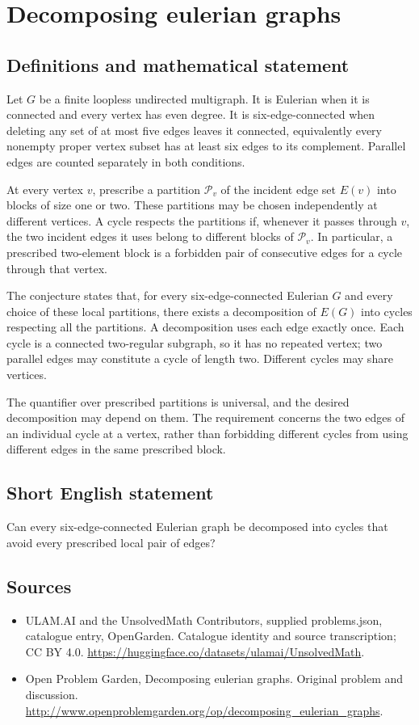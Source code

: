 \documentclass[11pt,a4paper]{article}
\begin{document}
\section*{Decomposing eulerian graphs}\label{statement}

\subsection{Definitions and mathematical statement}
Let $G$ be a finite loopless undirected multigraph. It is Eulerian when it is connected and every vertex has even degree. It is six-edge-connected when deleting any set of at most five edges leaves it connected, equivalently every nonempty proper vertex subset has at least six edges to its complement. Parallel edges are counted separately in both conditions.

At every vertex $v$, prescribe a partition $\mathcal P_v$ of the incident edge set $E(v)$ into blocks of size one or two. These partitions may be chosen independently at different vertices. A cycle respects the partitions if, whenever it passes through $v$, the two incident edges it uses belong to different blocks of $\mathcal P_v$. In particular, a prescribed two-element block is a forbidden pair of consecutive edges for a cycle through that vertex.

The conjecture states that, for every six-edge-connected Eulerian $G$ and every choice of these local partitions, there exists a decomposition of $E(G)$ into cycles respecting all the partitions. A decomposition uses each edge exactly once. Each cycle is a connected two-regular subgraph, so it has no repeated vertex; two parallel edges may constitute a cycle of length two. Different cycles may share vertices.

The quantifier over prescribed partitions is universal, and the desired decomposition may depend on them. The requirement concerns the two edges of an individual cycle at a vertex, rather than forbidding different cycles from using different edges in the same prescribed block.
\subsection{Short English statement}
Can every six-edge-connected Eulerian graph be decomposed into cycles that avoid every prescribed local pair of edges?
\subsection{Sources}
\begin{itemize}
\item[S1] ULAM.AI and the UnsolvedMath Contributors, supplied problems.json, catalogue entry, OpenGarden. Catalogue identity and source transcription; CC BY 4.0.
\url{https://huggingface.co/datasets/ulamai/UnsolvedMath}.
\item[S2] Open Problem Garden, Decomposing eulerian graphs. Original problem and discussion.
\url{http://www.openproblemgarden.org/op/decomposing_eulerian_graphs}.
\end{itemize}
\end{document}
